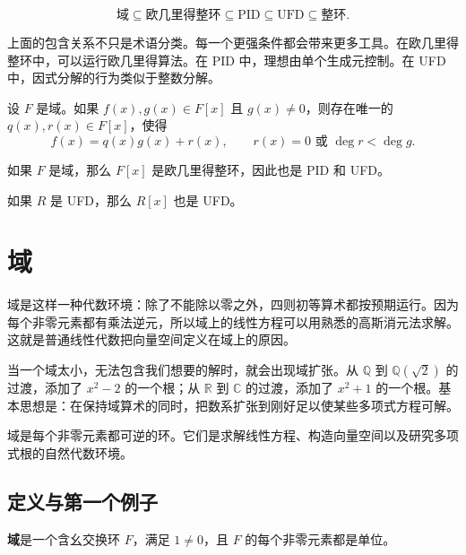 \begin{theorem}[整环的层级]
\[
    \text{域}\subseteq \text{欧几里得整环}\subseteq \text{PID}\subseteq \text{UFD}\subseteq \text{整环}.
\]
\end{theorem}

\begin{remark}
上面的包含关系不只是术语分类。每一个更强条件都会带来更多工具。在欧几里得整环中，可以运行欧几里得算法。在 PID 中，理想由单个生成元控制。在 UFD 中，因式分解的行为类似于整数分解。
\end{remark}

\begin{theorem}[多项式环中的除法算法]
设 $F$ 是域。如果 $f(x),g(x)\in F[x]$ 且 $g(x)\neq 0$，则存在唯一的 $q(x),r(x)\in F[x]$，使得
\[
    f(x)=q(x)g(x)+r(x),
    \qquad
    r(x)=0\text{ 或 }\deg r<\deg g.
\]
\end{theorem}

\begin{corollary}
如果 $F$ 是域，那么 $F[x]$ 是欧几里得整环，因此也是 PID 和 UFD。
\end{corollary}

\begin{theorem}[Gauss 引理]
如果 $R$ 是 UFD，那么 $R[x]$ 也是 UFD。
\end{theorem}

\section{域}


域是这样一种代数环境：除了不能除以零之外，四则初等算术都按预期运行。因为每个非零元素都有乘法逆元，所以域上的线性方程可以用熟悉的高斯消元法求解。这就是普通线性代数把向量空间定义在域上的原因。

当一个域太小，无法包含我们想要的解时，就会出现域扩张。从 $\mathbb{Q}$ 到 $\mathbb{Q}(\sqrt{2})$ 的过渡，添加了 $x^2-2$ 的一个根；从 $\mathbb{R}$ 到 $\mathbb{C}$ 的过渡，添加了 $x^2+1$ 的一个根。基本思想是：在保持域算术的同时，把数系扩张到刚好足以使某些多项式方程可解。

域是每个非零元素都可逆的环。它们是求解线性方程、构造向量空间以及研究多项式根的自然代数环境。

\subsection{定义与第一个例子}

\begin{definition}[域]
\textbf{域}是一个含幺交换环 $F$，满足 $1\neq 0$，且 $F$ 的每个非零元素都是单位。
\end{definition}

